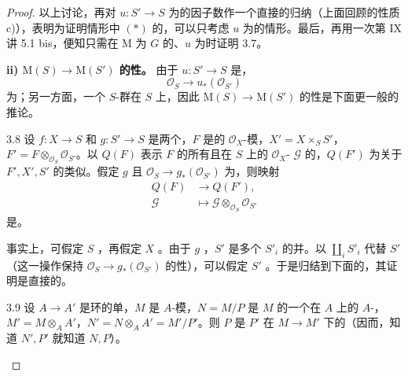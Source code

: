 \begin{proof}
以上讨论，再对 $u:S'\to S$ 为的因子数作一个直接的归纳（上面回顾的性质 c)），表明为证明情形中 $(*)$ 的，可以只考虑 $u$ 为的情形。最后，再用一次第 IX 讲 5.1 bis，便知只需在 $\mathrm M$ 为 $G$ 的、$u$ 为时证明 3.7。

\textbf{ii) $\mathrm M(S)\to\mathrm M(S')$ 的性。}
由于 $u:S'\to S$ 是，
\[\mathcal O_S\longrightarrow u_*(\mathcal O_{S'})\]
为；另一方面，一个 $S$-群在 $S$ 上，因此 $\mathrm M(S)\to\mathrm M(S')$ 的性是下面更一般的推论。
\begin{SGAresult}{}{3.8}
设 $f:X\to S$ 和 $g:S'\to S$ 是两个，$F$ 是的 $\mathcal O_X$-模，$X'=X\times_S S'$，$F'=F\otimes_{\mathcal O_S}\mathcal O_{S'}$。以 $Q(F)$ 表示 $F$ 的所有且在 $S$ 上的 $\mathcal O_X$- $\mathcal G$ 的，$Q(F')$ 为关于 $F',X',S'$ 的类似。假定 $g$ 且 $\mathcal O_S\to g_*(\mathcal O_{S'})$ 为，则映射
\[\begin{aligned}Q(F)&\longrightarrow Q(F'),\\\mathcal G&\longmapsto\mathcal G\otimes_{\mathcal O_S}\mathcal O_{S'}\end{aligned}\]
是。
\end{SGAresult}
事实上，可假定 $S$ ，再假定 $X$ 。由于 $g$ ，$S'$ 是多个 $S'_i$ 的并。以 $\coprod_i S'_i$ 代替 $S'$（这一操作保持 $\mathcal O_S\to g_*(\mathcal O_{S'})$ 的性），可以假定
$S'$ 。于是归结到下面的，其证明是直接的。
\begin{SGAresult}{}{3.9}
设 $A\to A'$ 是环的单，$M$ 是 $A$-模，$N=M/P$ 是 $M$ 的一个在 $A$ 上的 $A$-，$M'=M\otimes_A A'$，$N'=N\otimes_A A'=M'/P'$。则 $P$ 是 $P'$ 在 $M\to M'$ 下的（因而，知道 $N',P'$ 就知道 $N,P$）。

\end{SGAresult}
\end{proof}
